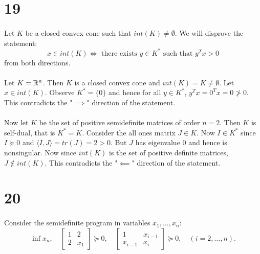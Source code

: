 \documentclass[letterpaper,12pt,oneside,onecolumn]{article}
\newcommand{\1}{\mathbbm{1}}
\begin{document}
\section*{19}
\paragraph{}
Let $K$ be a closed convex cone such that $int(K) \neq \emptyset$. We will disprove the statement:
$$\text{$x\in int(K) \iff $ there exists $y \in K^*$ such that $y^Tx > 0$}$$
from both directions.
\paragraph{}
Let $K = \mathbb{R}^n$. Then $K$ is a closed convex cone and $int(K) = K \neq \emptyset$. Let $x \in int(K)$. Observe $K^* = \{0\}$ and hence for all $y \in K^*$, $y^Tx = 0^Tx = 0 \not> 0$. This contradicts the "$\implies$" direction of the statement.
\paragraph{}
Now let $K$ be the set of positive semidefinite matrices of order $n = 2$. Then $K$ is self-dual, that is $K^* = K$. Consider the all ones matrix $J \in K$. Now $I \in K^*$ since $I \succcurlyeq 0$ and $\langle I, J\rangle = tr(J) = 2 > 0$. But $J$ has eigenvalue $0$ and hence is nonsingular. Now since $int(K)$ is the set of positive definite matrices, $J \not\in int(K)$. This contradicts the "$\impliedby$" direction of the statement.
\section*{20}
\paragraph{}
Consider the semidefinite program in variables $x_1, \dots, x_n$:
$$\inf x_n,\quad \begin{bmatrix} 1 & 2 \\2 & x_1\end{bmatrix} \succcurlyeq 0, \quad \begin{bmatrix} 1 & x_{i-1}\\ x_{i-1} & x_i \end{bmatrix} \succcurlyeq 0, \quad (i=2,\dots,n).$$
\end{document}
